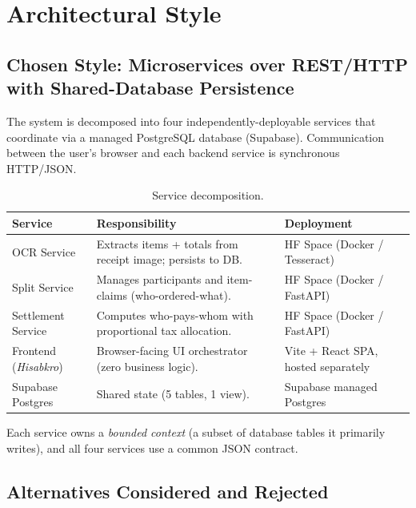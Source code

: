 \documentclass[11pt, a4paper]{article}
\begin{document}
\section{Architectural Style}
\label{sec:arch}

\subsection{Chosen Style: Microservices over REST/HTTP with Shared-Database Persistence}

The system is decomposed into four independently-deployable services that coordinate via a managed PostgreSQL database (Supabase). Communication between the user's browser and each backend service is synchronous HTTP/JSON.

\begin{table}[h!]
\centering
\caption{Service decomposition.}
\begin{tabularx}{\textwidth}{l X l}
\toprule
\textbf{Service} & \textbf{Responsibility} & \textbf{Deployment} \\
\midrule
OCR Service & Extracts items + totals from receipt image; persists to DB. & HF Space (Docker / Tesseract) \\
Split Service & Manages participants and item-claims (who-ordered-what). & HF Space (Docker / FastAPI) \\
Settlement Service & Computes who-pays-whom with proportional tax allocation. & HF Space (Docker / FastAPI) \\
Frontend (\textit{Hisabkro}) & Browser-facing UI orchestrator (zero business logic). & Vite + React SPA, hosted separately \\
Supabase Postgres & Shared state (5 tables, 1 view). & Supabase managed Postgres \\
\bottomrule
\end{tabularx}
\end{table}

Each service owns a \textit{bounded context} (a subset of database tables it primarily writes), and all four services use a common JSON contract.

\subsection{Alternatives Considered and Rejected}
\label{sec:alternatives}
\end{document}
